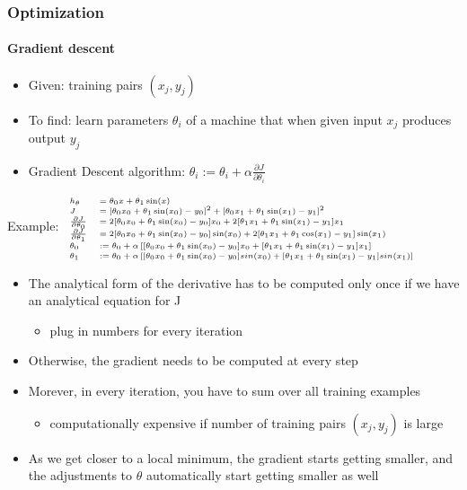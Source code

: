 \begin{frame}
\frametitle{Optimization}
\framesubtitle{Gradient descent}
\logoCSIPCPL\mypagenum\mypagenum
	\begin{itemize}\tiny
		\item {\color{red}Given:} training pairs $(x_j, y_j)$
		\item {\color{red}To find:} learn parameters $\theta_i$ of a machine that when given input $x_j$ produces output $y_j$
		\item {\color{red}Gradient Descent algorithm:} $\theta_i :=\theta_i + \alpha \frac{\partial J}{\partial \theta_i}$
	\end{itemize}
Example:
$\mbox{\fontsize{6}{8}\selectfont$
	\begin{array}{ll}
		h_{\theta} &= \theta_0 x + \theta_1 \sin(x) \\
		J&= [\theta_0 x_0 + \theta_1 \sin(x_0) - y_0]^2  + [\theta_0 x_1 + \theta_1 \sin(x_1) - y_1]^2\\
		\frac{\partial J}{\partial \theta_0} &= 2[\theta_0 x_0 + \theta_1 \sin(x_0) - y_0]x_0 +  2[\theta_1 x_1 + \theta_1 \sin(x_1) - y_1]x_1\\
		\frac{\partial J}{\partial \theta_1} &= 2[\theta_0 x_0 + \theta_1 \sin(x_0) - y_0]\sin(x_0) +  2[\theta_1 x_1 + \theta_1 \cos(x_1) - y_1]\sin(x_1)\\
\theta_0 &:= \theta_0 + \alpha \left[[\theta_0 x_0 + \theta_1 \sin(x_0) - y_0]x_0 +  [\theta_1 x_1 + \theta_1 \sin(x_1) - y_1]x_1\right]\\
\theta_1 &:= \theta_0 + \alpha\left[ [\theta_0 x_0 + \theta_1 \sin(x_0) - y_0]sin(x_0) +  [\theta_1 x_1 + \theta_1 \sin(x_1) - y_1]sin(x_1)\right]
	\end{array}
$}$

	\begin{itemize}\tiny
		\item The analytical form of the derivative has to be computed only once if we have an analytical equation for J
			\begin{itemize}\tiny
				\item plug in numbers for every iteration
			\end{itemize}			
		\item Otherwise, the gradient needs to be computed at every step
		\item Morever, in every iteration, you have to sum over all training examples
			\begin{itemize}\tiny
				\item computationally expensive if number of  training pairs $(x_j, y_j)$ is large
			\end{itemize}
		\item As we get closer to a local minimum, the gradient starts getting smaller, and the adjustments to $\theta$ automatically start getting smaller as well
	\end{itemize}
\end{frame}




